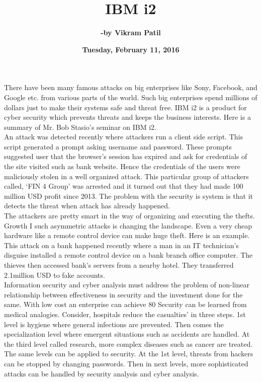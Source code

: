 \documentclass{article}
\title{\textbf {IBM i2}}
\author{\textbf {-by Vikram Patil}}
\date{\textbf {Tuesday, February 11, 2016}}
\begin{document}
\maketitle

There have been many famous attacks on big enterprises like Sony, Facebook, and Google etc. from various parts of the world. Such big enterprises spend millions of dollars just to make their systems safe and threat free. IBM i2 is a product for cyber security which prevents threats and keeps the business interests. Here is a summary of Mr. Bob Stasio’s seminar on IBM i2.\\
An attack was detected recently where attackers run a client side script. This script generated a prompt asking username and password. These prompts suggested user that the browser’s session has expired and ask for credentials of the site visited such as bank website. Hence the credentials of the users were maliciously stolen in a well organized attack. This particular group of attackers called, ‘FIN 4 Group’ was arrested and it turned out that they had made 100 million USD profit since 2013. The problem with the security is system is that it detects the threat when attack has already happened.\\
The attackers are pretty smart in the way of organizing and executing the thefts. Growth I such asymmetric attacks is changing the landscape. Even a very cheap hardware like a remote control device can make huge theft. Here is an example. This attack on a bank happened recently where a man in an IT technician’s disguise installed a remote control device on a bank branch office computer. The thieves then accessed bank’s servers from a nearby hotel. They transferred 2.1million USD to fake accounts.\\	
Information security and cyber analysis must address the problem of non-linear relationship between effectiveness in security and the investment done for the same.  With low cost an enterprise can achieve 80%
Security can be learned from medical analogies. Consider, hospitals reduce the casualties’ in three steps. 1st level is hygiene where general infections are prevented. Then comes the specialization level where emergent situations such as accidents are handled. At the third level called research, more complex diseases such as cancer are treated. The same levels can be applied to security. At the 1st level, threats from hackers can be stopped by changing passwords. Then in next levels, more sophisticated attacks can be handled by security analysis and cyber analysis.\\
\end{document}

